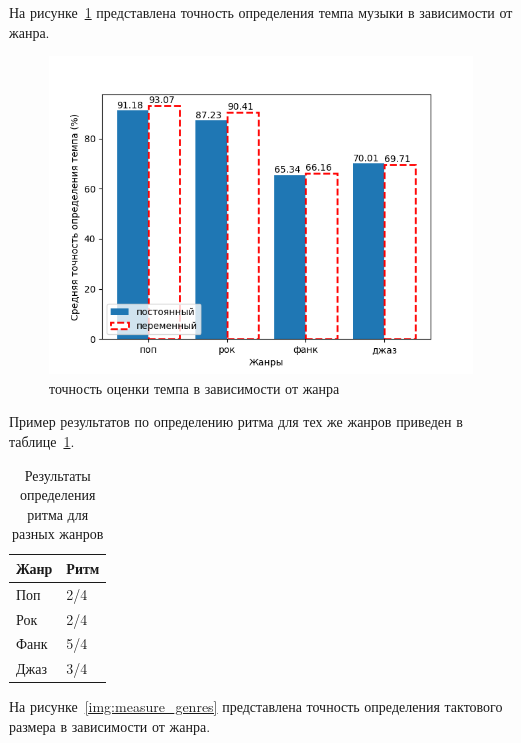 \newpage

На рисунке~\ref{img:tempo_genres} представлена точность определения темпа музыки в зависимости от жанра.

\begin{figure}[h]
	\centering
	\includegraphics[scale=1]{../graphs/tempo_genres.png}
	\caption{точность оценки темпа в зависимости от жанра}
	\label{img:tempo_genres}
\end{figure}

Пример результатов по определению ритма для тех же жанров приведен в таблице~\ref{tab:rhythm_genres}.

\begin{table}[!h]
	\begin{center}
		\caption{\label{tab:rhythm_genres}Результаты определения ритма для разных жанров}
		\begin{tabular}{|p{8cm}|p{8cm}|}
			\hline
			\textbf{Жанр} & \textbf{Ритм}\\
			\hline
			Поп & 2/4\\
			\hline
			Рок & 2/4\\
			\hline
			Фанк & 5/4\\
			\hline
			Джаз & 3/4\\
			\hline
		\end{tabular}
	\end{center}
\end{table}

\newpage

На рисунке~\ref{img:measure_genres} представлена точность определения тактового размера в зависимости от жанра.

